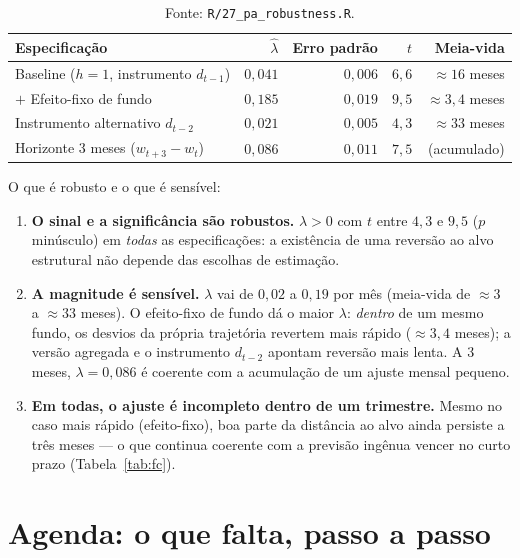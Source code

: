\documentclass[11pt,a4paper]{article}
\begin{document}
\begin{table}[h]\centering\small
\caption{Robustez da velocidade de ajuste $\lambda$ (VI, erro-padrão agrupado por fundo).}
\label{tab:rob}
\begin{tabular}{@{}lrrrr@{}}
\toprule
Especificação & $\widehat{\lambda}$ & Erro padrão & $t$ & Meia-vida \\
\midrule
Baseline ($h{=}1$, instrumento $d_{t-1}$) & $0{,}041$ & $0{,}006$ & $6{,}6$ & $\approx16$ meses \\
$+$ Efeito-fixo de fundo                  & $0{,}185$ & $0{,}019$ & $9{,}5$ & $\approx3{,}4$ meses \\
Instrumento alternativo $d_{t-2}$         & $0{,}021$ & $0{,}005$ & $4{,}3$ & $\approx33$ meses \\
Horizonte 3 meses ($w_{t+3}-w_t$)         & $0{,}086$ & $0{,}011$ & $7{,}5$ & (acumulado) \\
\bottomrule
\end{tabular}
\caption*{\footnotesize Fonte: \texttt{R/27\_pa\_robustness.R}.}
\end{table}

\noindent O que é robusto e o que é sensível:
\begin{enumerate}[topsep=2pt,itemsep=1pt]
\item \textbf{O sinal e a significância são robustos.} $\lambda>0$ com $t$ entre $4{,}3$ e $9{,}5$
($p$ minúsculo) em \emph{todas} as especificações: a existência de uma reversão ao alvo estrutural
não depende das escolhas de estimação.
\item \textbf{A magnitude é sensível.} $\lambda$ vai de $0{,}02$ a $0{,}19$ por mês (meia-vida de
$\approx3$ a $\approx33$ meses). O efeito-fixo de fundo dá o maior $\lambda$: \emph{dentro} de um
mesmo fundo, os desvios da própria trajetória revertem mais rápido ($\approx3{,}4$ meses); a versão
agregada e o instrumento $d_{t-2}$ apontam reversão mais lenta. A 3 meses, $\lambda=0{,}086$ é
coerente com a acumulação de um ajuste mensal pequeno.
\item \textbf{Em todas, o ajuste é incompleto dentro de um trimestre.} Mesmo no caso mais rápido
(efeito-fixo), boa parte da distância ao alvo ainda persiste a três meses --- o que continua
coerente com a previsão ingênua vencer no curto prazo (Tabela~\ref{tab:fc}).
\end{enumerate}

\section{Agenda: o que falta, passo a passo}
\end{document}
